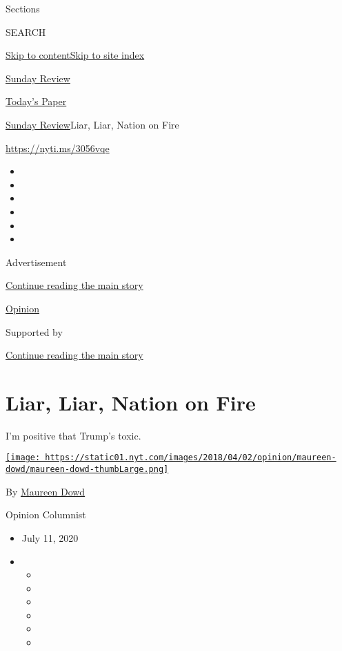 Sections

SEARCH

\protect\hyperlink{site-content}{Skip to
content}\protect\hyperlink{site-index}{Skip to site index}

\href{https://www.nytimes.com/section/opinion/sunday}{Sunday Review}

\href{https://myaccount.nytimes.com/auth/login?response_type=cookie\&client_id=vi}{}

\href{https://www.nytimes.com/section/todayspaper}{Today's Paper}

\href{/section/opinion/sunday}{Sunday Review}\textbar{}Liar, Liar,
Nation on Fire

\href{https://nyti.ms/3056vqe}{https://nyti.ms/3056vqe}

\begin{itemize}
\item
\item
\item
\item
\item
\item
\end{itemize}

Advertisement

\protect\hyperlink{after-top}{Continue reading the main story}

\href{/section/opinion}{Opinion}

Supported by

\protect\hyperlink{after-sponsor}{Continue reading the main story}

\hypertarget{liar-liar-nation-on-fire}{%
\section{Liar, Liar, Nation on Fire}\label{liar-liar-nation-on-fire}}

I'm positive that Trump's toxic.

\href{https://www.nytimes.com/by/maureen-dowd}{\texttt{[image: https://static01.nyt.com/images/2018/04/02/opinion/maureen-dowd/maureen-dowd-thumbLarge.png]}}

By \href{https://www.nytimes.com/by/maureen-dowd}{Maureen Dowd}

Opinion Columnist

\begin{itemize}
\item
  July 11, 2020
\item
  \begin{itemize}
  \item
  \item
  \item
  \item
  \item
  \item
  \end{itemize}
\end{itemize}

